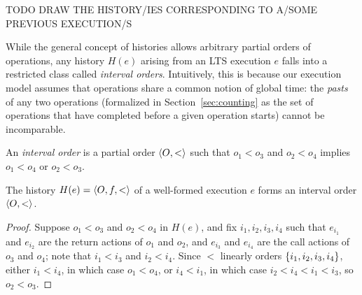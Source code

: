\begin{example}
  \label{ex:histories}

  TODO DRAW THE HISTORY/IES CORRESPONDING TO A/SOME PREVIOUS EXECUTION/S

\end{example}

While the general concept of histories allows arbitrary partial orders of
operations, any history $H(e)$ arising from an LTS execution $e$ falls into a
restricted class called \emph{interval orders}. Intuitively, this is because
our execution model assumes that operations share a common notion of global
time: the \emph{pasts} of any two operations (formalized in
Section~\ref{sec:counting} as the set of operations that have completed before
a given operation starts) cannot be incomparable.

\begin{definition}

  An \emph{interval order} is a partial order $\left\langle {O,<} \right\rangle$ such that
  $o_1 < o_3$ and $o_2 < o_4$ implies $o_1 < o_4$ or $o_2 < o_3$.

\end{definition}

\begin{lemma}
  \label{lem:intervals}

  The history $H(e) = \left\langle {O,f,<} \right\rangle$ of a well-formed execution $e$ forms an
  interval order $\left\langle {O,<} \right\rangle$.

\end{lemma}

\begin{proof}

  Suppose $o_1 < o_3$ and $o_2 < o_4$ in $H(e)$, and fix $i_1, i_2, i_3, i_4$
  such that $e_{i_1}$ and $e_{i_2}$ are the return actions of $o_1$ and $o_2$,
  and $e_{i_3}$ and $e_{i_4}$ are the call actions of $o_3$ and $o_4$; note
  that $i_1 < i_3$ and $i_2 < i_4$. Since $<$ linearly orders ${\{ i_1, i_2,
  i_3, i_4 \}}$, either $i_1 < i_4$, in which case $o_1 < o_4$, or $i_4 < i_1$, in
  which case $i_2 < i_4 < i_1 < i_3$, so $o_2 < o_3$.

\end{proof}

